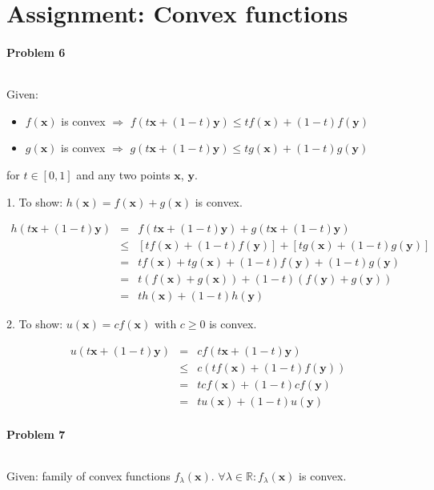 \documentclass{article}
\renewcommand{\Vec}[1]{\ensuremath{\mathbf{#1}}}
\begin{document}
\section{Assignment: Convex functions}
\paragraph*{Problem 6}
$\;$ 

Given:
\begin{itemize}
\item $f(\Vec{x})$ is convex $\Rightarrow$ $f(t\Vec{x} + (1-t)\Vec{y}) \leq tf(\Vec{x})+(1-t)f(\Vec{y})$
\item $g(\Vec{x})$ is convex $\Rightarrow$ $g(t\Vec{x} + (1-t)\Vec{y}) \leq tg(\Vec{x})+(1-t)g(\Vec{y})$
\end{itemize}
for $t \in [0,1]$ and any two points $\Vec{x}$, $\Vec{y}$.

1. To show: $h(\Vec{x}) = f(\Vec{x}) + g(\Vec{x})$ is convex.

\begin{eqnarray}
h(t\Vec{x} + (1-t)\Vec{y}) &=& f(t\Vec{x} + (1-t)\Vec{y}) + g(t\Vec{x} + (1-t)\Vec{y})\\
&\leq& [tf(\Vec{x})+(1-t)f(\Vec{y})] + [tg(\Vec{x})+(1-t)g(\Vec{y})]\\
&=& tf(\Vec{x}) + tg(\Vec{x}) + (1-t)f(\Vec{y}) + (1-t)g(\Vec{y})\\
&=& t(f(\Vec{x}) + g(\Vec{x})) + (1-t)(f(\Vec{y}) + g(\Vec{y}))\\
&=& th(\Vec{x}) + (1-t)h(\Vec{y})
\end{eqnarray}

2. To show: $u(\Vec{x}) = cf(\Vec{x})$ with $c \geq 0$ is convex.

\begin{eqnarray}
u(t\Vec{x} + (1-t)\Vec{y}) &=& cf(t\Vec{x} + (1-t)\Vec{y})\\
&\leq& c(tf(\Vec{x})+(1-t)f(\Vec{y}))\\
&=& tcf(\Vec{x})+(1-t)cf(\Vec{y})\\
&=& tu(\Vec{x})+(1-t)u(\Vec{y})
\end{eqnarray}


\paragraph*{Problem 7}
$\;$ 

Given: family of convex functions $f_{\lambda}(\Vec{x})$. $\forall \lambda \in \mathbb{R}: f_{\lambda}(\Vec{x})$ is convex.
\end{document}
